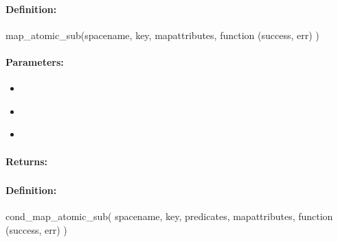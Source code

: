 \paragraph{Definition:}
\begin{javascriptcode}
map_atomic_sub(spacename, key, mapattributes, function (success, err) {})
\end{javascriptcode}
\paragraph{Parameters:}
\begin{itemize}[noitemsep]
\item {}\\

\item {}\\

\item {}\\

\end{itemize}

\paragraph{Returns:}


\pagebreak
\subsubsection{}
\label{api:nodejs:cond_map_atomic_sub}


\paragraph{Definition:}
\begin{javascriptcode}
cond_map_atomic_sub(
        spacename, key, predicates, mapattributes, function (success, err) {})
\end{javascriptcode}
